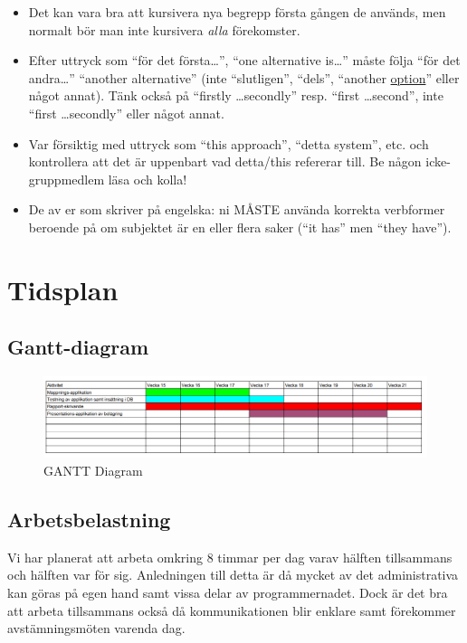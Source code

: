 \documentclass[swedish, a4paper,12pt]{article}
\begin{document}
\begin{itemize}
\item    Det kan vara bra att kursivera nya begrepp första gången de används, men normalt bör man inte kursivera \emph{alla} förekomster.

\item    Efter uttryck som ``för det första\ldots'', ``one alternative is\ldots'' måste följa ``för det andra\ldots'' ``another alternative'' (inte ``slutligen'', ``dels'', ``another \underline{option}'' eller något annat).  Tänk också på ``firstly \ldots secondly'' resp. ``first \ldots second'', inte ``first \ldots secondly'' eller något annat.

\item    Var försiktig med uttryck som ``this approach'', ``detta system'', etc. och kontrollera att det är uppenbart vad detta/this refererar till. Be någon icke-gruppmedlem läsa och kolla!

\item    De av er som skriver på engelska: ni MÅSTE använda korrekta verbformer beroende på om subjektet är en eller flera saker (``it has'' men ``they have'').
\end{itemize}
\fi
\section{Tidsplan}
\subsection{Gantt-diagram}

\begin{figure}[h]
	\includegraphics[width=15cm]{media/GANTT.png}
	\caption{GANTT Diagram}
	\label{}
\end{figure}

\subsection{Arbetsbelastning}
Vi har planerat att arbeta omkring 8 timmar per dag varav hälften tillsammans och hälften var för sig. Anledningen till detta är då mycket av det administrativa kan göras på egen hand samt vissa delar av programmernadet. Dock är det bra att arbeta tillsammans också då kommunikationen blir enklare samt förekommer avstämningsmöten varenda dag.
\end{document}

